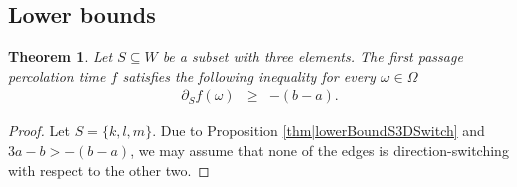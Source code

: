 \documentclass[reqno]{amsart}
\newtheorem{theorem}{Theorem}[section]
\begin{document}
\subsection{Lower bounds}\label{subs|L3}
\begin{theorem}\label{thm|lowerBoundS3}
Let $S\subseteq W$ be a subset with three elements. The first passage percolation time $f$ satisfies the following inequality for every $\omega\in\Omega$
\begin{eqnarray}
\partial_Sf(\omega)&\geq& -(b-a). \label{eqn|lowerBoundS3}
\end{eqnarray}
\end{theorem}
\begin{proof} Let $S=\{k,l,m\}$. Due to Proposition \ref{thm|lowerBoundS3DSwitch} and $3a-b> -(b-a)$, we may assume that none of the edges is direction-switching with respect to the other two. 


\end{proof}
\end{document}
